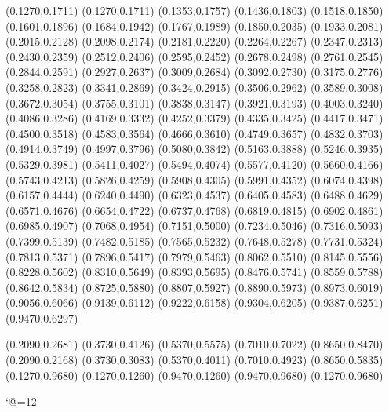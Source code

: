 \PST@Dashed(0.1270,0.1711)
(0.1270,0.1711)
(0.1353,0.1757)
(0.1436,0.1803)
(0.1518,0.1850)
(0.1601,0.1896)
(0.1684,0.1942)
(0.1767,0.1989)
(0.1850,0.2035)
(0.1933,0.2081)
(0.2015,0.2128)
(0.2098,0.2174)
(0.2181,0.2220)
(0.2264,0.2267)
(0.2347,0.2313)
(0.2430,0.2359)
(0.2512,0.2406)
(0.2595,0.2452)
(0.2678,0.2498)
(0.2761,0.2545)
(0.2844,0.2591)
(0.2927,0.2637)
(0.3009,0.2684)
(0.3092,0.2730)
(0.3175,0.2776)
(0.3258,0.2823)
(0.3341,0.2869)
(0.3424,0.2915)
(0.3506,0.2962)
(0.3589,0.3008)
(0.3672,0.3054)
(0.3755,0.3101)
(0.3838,0.3147)
(0.3921,0.3193)
(0.4003,0.3240)
(0.4086,0.3286)
(0.4169,0.3332)
(0.4252,0.3379)
(0.4335,0.3425)
(0.4417,0.3471)
(0.4500,0.3518)
(0.4583,0.3564)
(0.4666,0.3610)
(0.4749,0.3657)
(0.4832,0.3703)
(0.4914,0.3749)
(0.4997,0.3796)
(0.5080,0.3842)
(0.5163,0.3888)
(0.5246,0.3935)
(0.5329,0.3981)
(0.5411,0.4027)
(0.5494,0.4074)
(0.5577,0.4120)
(0.5660,0.4166)
(0.5743,0.4213)
(0.5826,0.4259)
(0.5908,0.4305)
(0.5991,0.4352)
(0.6074,0.4398)
(0.6157,0.4444)
(0.6240,0.4490)
(0.6323,0.4537)
(0.6405,0.4583)
(0.6488,0.4629)
(0.6571,0.4676)
(0.6654,0.4722)
(0.6737,0.4768)
(0.6819,0.4815)
(0.6902,0.4861)
(0.6985,0.4907)
(0.7068,0.4954)
(0.7151,0.5000)
(0.7234,0.5046)
(0.7316,0.5093)
(0.7399,0.5139)
(0.7482,0.5185)
(0.7565,0.5232)
(0.7648,0.5278)
(0.7731,0.5324)
(0.7813,0.5371)
(0.7896,0.5417)
(0.7979,0.5463)
(0.8062,0.5510)
(0.8145,0.5556)
(0.8228,0.5602)
(0.8310,0.5649)
(0.8393,0.5695)
(0.8476,0.5741)
(0.8559,0.5788)
(0.8642,0.5834)
(0.8725,0.5880)
(0.8807,0.5927)
(0.8890,0.5973)
(0.8973,0.6019)
(0.9056,0.6066)
(0.9139,0.6112)
(0.9222,0.6158)
(0.9304,0.6205)
(0.9387,0.6251)
(0.9470,0.6297)

\PST@Diamond(0.2090,0.2681)
\PST@Diamond(0.3730,0.4126)
\PST@Diamond(0.5370,0.5575)
\PST@Diamond(0.7010,0.7022)
\PST@Diamond(0.8650,0.8470)
\PST@Plus(0.2090,0.2168)
\PST@Plus(0.3730,0.3083)
\PST@Plus(0.5370,0.4011)
\PST@Plus(0.7010,0.4923)
\PST@Plus(0.8650,0.5835)
\PST@Border(0.1270,0.9680)
(0.1270,0.1260)
(0.9470,0.1260)
(0.9470,0.9680)
(0.1270,0.9680)

\catcode`@=12
\fi
\endpspicture
